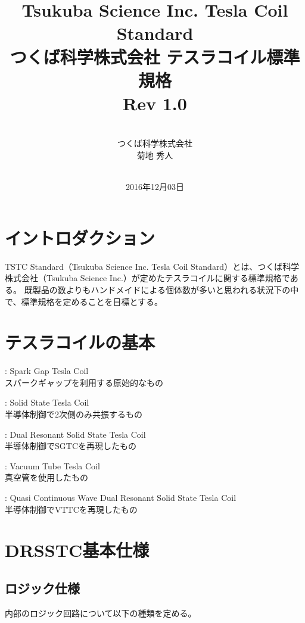 \documentclass[a4paper,11pt]{jsarticle}
\title{Tsukuba Science Inc. Tesla Coil Standard \\ つくば科学株式会社 テスラコイル標準規格 \\ Rev 1.0}
\author{\vspace*{20mm}\ \\つくば科学株式会社\\菊地 秀人}
\date{\vspace*{20mm}\ \\2016年12月03日}
\begin{document}
\maketitle

\clearpage

\section{イントロダクション}
TSTC Standard（Tsukuba Science Inc. Tesla Coil Standard）とは、つくば科学株式会社（Tsukuba Science Inc.）が定めたテスラコイルに関する標準規格である。
既製品の数よりもハンドメイドによる個体数が多いと思われる状況下の中で、標準規格を定めることを目標とする。


\section{テスラコイルの基本}

\vspace{10pt}
\begin{description}
\setlength{\leftskip}{0.5cm}
	\item [SGTC] : Spark Gap Tesla Coil\\
	スパークギャップを利用する原始的なもの
	\item [SSTC] : Solid State Tesla Coil\\
	半導体制御で2次側のみ共振するもの
	\item [DRSSTC] : Dual Resonant Solid State Tesla Coil\\
	半導体制御でSGTCを再現したもの
	\item [VTTC] : Vacuum Tube Tesla Coil\\
	真空管を使用したもの
	\item [QCWDRSSTC] : Quasi Continuous Wave Dual Resonant Solid State Tesla Coil\\
	半導体制御でVTTCを再現したもの
\end{description}
\vspace{10pt}

\section{DRSSTC基本仕様}

\subsection{ロジック仕様}
内部のロジック回路について以下の種類を定める。\\
\end{document}
